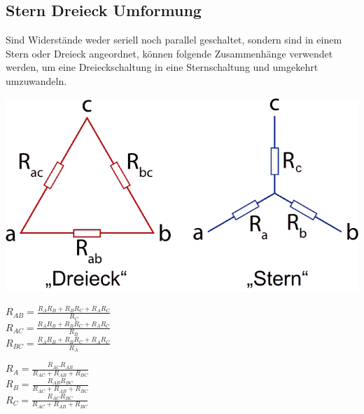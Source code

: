 \subsection{Stern Dreieck Umformung}
Sind Widerstände weder seriell noch parallel geschaltet, sondern sind in einem Stern oder Dreieck angeordnet,
können folgende Zusammenhänge verwendet werden, um eine Dreieckschaltung in eine Sternschaltung und umgekehrt umzuwandeln.
\begin{center}
	\includegraphics[scale=0.3]{img/Stern-Dreieck-Transformation.png}
\end{center}

\begin{minipage}{0.5\textwidth}
	\begin{center}

		${R}_{AB}=\frac{{R}_{A}{R}_{B}+{R}_{B}{R}_{C}+{R}_{A}{R}_{C}}{{R}_{C}}$\\
		${R}_{AC}=\frac{{R}_{A}{R}_{B}+{R}_{B}{R}_{C}+{R}_{A}{R}_{C}}{{R}_{B}}$\\
		${R}_{BC}=\frac{{R}_{A}{R}_{B}+{R}_{B}{R}_{C}+{R}_{A}{R}_{C}}{{R}_{A}}$\\

	\end{center}
\end{minipage}
\begin{minipage}{0.5\textwidth}
	\begin{center}

		${R}_A=\frac{{R}_{AC}{R}_{AB}}{{R}_{AC}+{R}_{AB}+{R}_{BC}}$\\
		${R}_B=\frac{{R}_{AB}{R}_{BC}}{{R}_{AC}+{R}_{AB}+{R}_{BC}}$\\
		${R}_C=\frac{{R}_{AC}{R}_{BC}}{{R}_{AC}+{R}_{AB}+{R}_{BC}}$

	\end{center}
\end{minipage}

